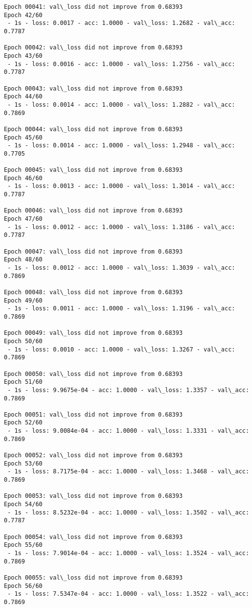 \documentclass[11pt]{article}
\begin{document}
\begin{Verbatim}[commandchars=\\\{\}]
Epoch 00041: val\_loss did not improve from 0.68393
Epoch 42/60
 - 1s - loss: 0.0017 - acc: 1.0000 - val\_loss: 1.2682 - val\_acc: 0.7787

Epoch 00042: val\_loss did not improve from 0.68393
Epoch 43/60
 - 1s - loss: 0.0016 - acc: 1.0000 - val\_loss: 1.2756 - val\_acc: 0.7787

Epoch 00043: val\_loss did not improve from 0.68393
Epoch 44/60
 - 1s - loss: 0.0014 - acc: 1.0000 - val\_loss: 1.2882 - val\_acc: 0.7869

Epoch 00044: val\_loss did not improve from 0.68393
Epoch 45/60
 - 1s - loss: 0.0014 - acc: 1.0000 - val\_loss: 1.2948 - val\_acc: 0.7705

Epoch 00045: val\_loss did not improve from 0.68393
Epoch 46/60
 - 1s - loss: 0.0013 - acc: 1.0000 - val\_loss: 1.3014 - val\_acc: 0.7787

Epoch 00046: val\_loss did not improve from 0.68393
Epoch 47/60
 - 1s - loss: 0.0012 - acc: 1.0000 - val\_loss: 1.3186 - val\_acc: 0.7787

Epoch 00047: val\_loss did not improve from 0.68393
Epoch 48/60
 - 1s - loss: 0.0012 - acc: 1.0000 - val\_loss: 1.3039 - val\_acc: 0.7869

Epoch 00048: val\_loss did not improve from 0.68393
Epoch 49/60
 - 1s - loss: 0.0011 - acc: 1.0000 - val\_loss: 1.3196 - val\_acc: 0.7869

Epoch 00049: val\_loss did not improve from 0.68393
Epoch 50/60
 - 1s - loss: 0.0010 - acc: 1.0000 - val\_loss: 1.3267 - val\_acc: 0.7869

Epoch 00050: val\_loss did not improve from 0.68393
Epoch 51/60
 - 1s - loss: 9.9675e-04 - acc: 1.0000 - val\_loss: 1.3357 - val\_acc: 0.7869

Epoch 00051: val\_loss did not improve from 0.68393
Epoch 52/60
 - 1s - loss: 9.0084e-04 - acc: 1.0000 - val\_loss: 1.3331 - val\_acc: 0.7869

Epoch 00052: val\_loss did not improve from 0.68393
Epoch 53/60
 - 1s - loss: 8.7175e-04 - acc: 1.0000 - val\_loss: 1.3468 - val\_acc: 0.7869

Epoch 00053: val\_loss did not improve from 0.68393
Epoch 54/60
 - 1s - loss: 8.5232e-04 - acc: 1.0000 - val\_loss: 1.3502 - val\_acc: 0.7787

Epoch 00054: val\_loss did not improve from 0.68393
Epoch 55/60
 - 1s - loss: 7.9014e-04 - acc: 1.0000 - val\_loss: 1.3524 - val\_acc: 0.7869

Epoch 00055: val\_loss did not improve from 0.68393
Epoch 56/60
 - 1s - loss: 7.5347e-04 - acc: 1.0000 - val\_loss: 1.3522 - val\_acc: 0.7869


\end{Verbatim}
\end{document}
